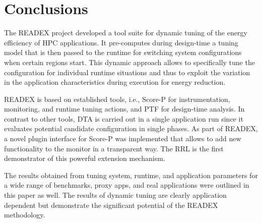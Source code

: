 \documentclass[runningheads]{llncs}
\begin{document}
\section{Conclusions} \label{sec:conclusions}

The READEX project developed a tool suite for dynamic tuning of the energy efficiency of HPC applications. It pre-computes during design-time a tuning model that is then passed to the runtime for switching system configurations when certain regions start. This dynamic approach allows to specifically tune the configuration for individual runtime situations and thus to exploit the variation in the application characteristics during execution for energy reduction. 

READEX is based on established tools, i.e., Score-P for instrumentation, monitoring, and runtime tuning actions, and PTF for design-time analysis. In contrast to other tools, DTA is carried out in a single application run since it evaluates potential candidate configuration in single phases. As part of READEX, a novel plugin interface for Score-P was implemented that allows to add new functionality to the monitor in a transparent way. The RRL is the first demonstrator of this powerful extension mechanism.

The results obtained from tuning system, runtime, and application parameters for a wide range of benchmarks, proxy apps, and real applications were outlined in this paper as well. The results of dynamic tuning are clearly application dependent but demonstrate the significant potential of the READEX methodology.



%
 
 
\end{document}

